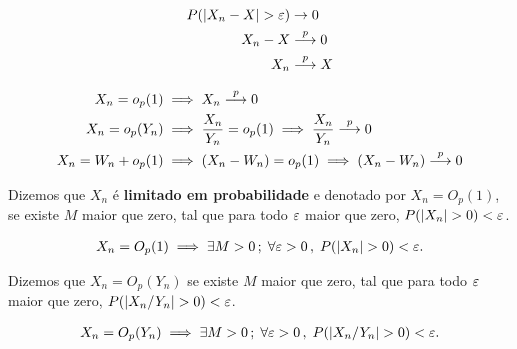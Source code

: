 \documentclass[11pt, oneside, a4paper, article]{article}
\numberwithin{equation}{section}
\begin{document}
\begin{description}
\begin{description}
\begin{def1}
\begin{align*}
P( | X_{n} - X | > \varepsilon ) & \to 0
\\
X_{n} - X &  \overset{p}{\longrightarrow}  0
\\
X_{n} &  \overset{p}{\longrightarrow}  X
\end{align*}
\end{def1}

\begin{def1}[$o_{p}$]
\begin{align*}
X_{n} = o_{p}(1) & \implies X_{n}  \overset{p}{\longrightarrow}  0
\\
X_{n} = o_{p}(Y_{n}) & \implies
\frac{X_{n}}{Y_{n}} = o_{p}(1) \implies
\frac{X_{n}}{Y_{n}}  \overset{p}{\longrightarrow}  0
\\
X_{n} = W_{n} + o_{p}(1) & \implies
(X_{n} - W_{n}) = o_{p}(1) \implies
(X_{n} - W_{n})  \overset{p}{\longrightarrow}  0
\end{align*}
\end{def1}

\begin{def1}
Dizemos que $X_{n}$ é \textbf{limitado em probabilidade} e denotado por 
$X_{n} = O_{p}(1)$,
se existe $M$ maior que zero, tal que para todo $\varepsilon$ maior que zero, $P( | X_{n} | > 0) < \varepsilon$.

\vspace{-1 em}
\begin{align*}
X_{n} = O_{p}(1) \implies \exists M > 0 \, ; \;
\forall \varepsilon > 0 \, , \;
P( | X_{n} | > 0) < \varepsilon.
\end{align*}
\end{def1}

\begin{def1}
Dizemos que
$X_{n} = O_{p}(Y_{n})$ se existe $M$ maior que zero, tal que para todo $\varepsilon$ maior que zero, $P( | X_{n}/Y_{n} | > 0) < \varepsilon$.

\vspace{-1 em}
\begin{align*}
X_{n} = O_{p}(Y_{n}) \implies \exists M > 0 \, ; \;
\forall \varepsilon > 0 \, , \;
P( | X_{n}/Y_{n} | > 0) < \varepsilon.
\end{align*}
\end{def1}


\end{description}
\end{description}
\end{document}
